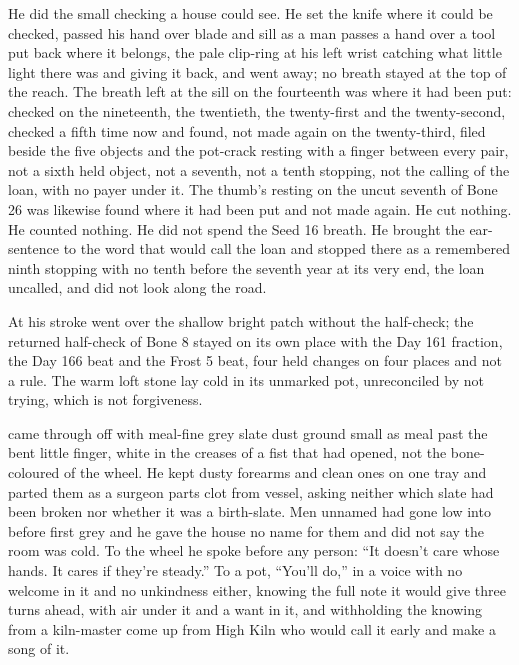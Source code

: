 He did the small checking a house could see. He set the knife where it could be checked, passed his hand over blade and sill as a man passes a hand over a tool put back where it belongs, the pale clip-ring at his left wrist catching what little light there was and giving it back, and went away; no breath stayed at the top of the reach. The breath left at the sill on the fourteenth was where it had been put: checked on the nineteenth, the twentieth, the twenty-first and the twenty-second, checked a fifth time now and found, not made again on the twenty-third, filed beside the five objects and the pot-crack resting with a finger between every pair, not a sixth held object, not a seventh, not a tenth stopping, not the calling of the loan, with no payer under it. The thumb's resting on the uncut seventh of Bone 26 was likewise found where it had been put and not made again. He cut nothing. He counted nothing. He did not spend the Seed 16 breath. He brought the ear-sentence to the word that would call the loan and stopped there as a remembered ninth stopping with no tenth before the seventh year at its very end, the loan uncalled, and did not look along the road.

At  his stroke went over the shallow bright patch without the half-check; the returned half-check of Bone 8 stayed on its own place with the Day 161 fraction, the Day 166 beat and the Frost 5 beat, four held changes on four places and not a rule. The warm loft stone lay cold in its unmarked pot, unreconciled by not trying, which is not forgiveness.

 came through  off  with meal-fine grey slate dust ground small as meal past the bent little finger, white in the creases of a fist that had opened, not the bone-coloured  of the wheel. He kept dusty forearms and clean ones on one tray and parted them as a surgeon parts clot from vessel, asking neither which slate had been broken nor whether it was a birth-slate. Men unnamed had gone low into  before first grey and he gave the house no name for them and did not say the room was cold. To the wheel he spoke before any person: “It doesn't care whose hands. It cares if they're steady.” To a pot, “You'll do,” in a voice with no welcome in it and no unkindness either, knowing the full note it would give three turns ahead, with air under it and a want in it, and withholding the knowing from a kiln-master come up from High Kiln who would call it early and make a song of it.

